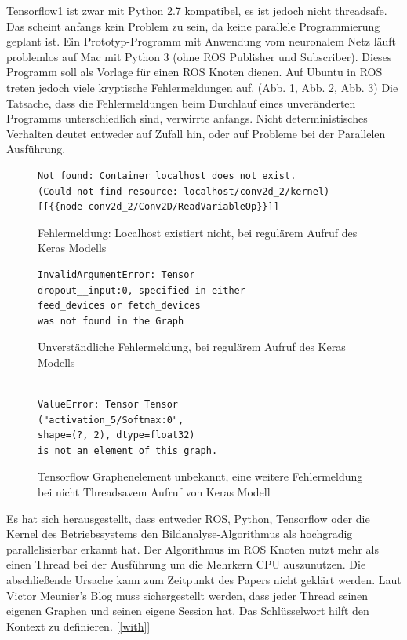 \documentclass[conference]{IEEEtran}
\begin{document}
Tensorflow1 ist zwar mit Python 2.7 kompatibel, es ist jedoch nicht 
threadsafe. Das scheint anfangs kein Problem zu sein, da keine parallele 
	Programmierung geplant ist. Ein Prototyp-Programm mit Anwendung vom 
	neuronalem Netz läuft problemlos auf Mac mit Python 3 (ohne ROS 
	Publisher und Subscriber). Dieses Programm 
	soll als Vorlage für einen ROS Knoten dienen. Auf Ubuntu in ROS treten 
	jedoch viele kryptische Fehlermeldungen auf. (Abb. \ref{Error1}, Abb. \ref{Error2}, Abb. \ref{Error3}) 
	Die Tatsache, dass die Fehlermeldungen beim Durchlauf eines 
	unveränderten Programms unterschiedlich sind, verwirrte anfangs. 
	Nicht deterministisches Verhalten deutet entweder auf Zufall hin, 
	oder auf Probleme bei der Parallelen Ausführung. 
	
	\begin{figure}
		\centering
		\begin{verbatim}
Not found: Container localhost does not exist. 
(Could not find resource: localhost/conv2d_2/kernel)
[[{{node conv2d_2/Conv2D/ReadVariableOp}}]]
\end{verbatim}
		\label{Error1}
		\caption{Fehlermeldung: Localhost existiert nicht, bei regulärem 
		Aufruf 
		des Keras Modells}
	\end{figure}
	
	\begin{figure}
		\centering
		\begin{verbatim}
InvalidArgumentError: Tensor 
dropout__input:0, specified in either 
feed_devices or fetch_devices
was not found in the Graph
		\end{verbatim}
		\label{Error2}
		\caption{Unverständliche Fehlermeldung, bei regulärem Aufruf 
			des Keras Modells}
	\end{figure}
		
	\begin{figure}
		\centering
		\begin{verbatim}

ValueError: Tensor Tensor
("activation_5/Softmax:0",
shape=(?, 2), dtype=float32) 
is not an element of this graph.
\end{verbatim}
		\label{Error3}
		\caption{Tensorflow Graphenelement unbekannt, eine weitere 
		Fehlermeldung bei nicht Threadsavem Aufruf von Keras Modell}
	\end{figure}
	
	Es hat sich herausgestellt, dass entweder ROS, Python, Tensorflow oder die Kernel 
	des Betriebssystems den Bildanalyse-Algorithmus als hochgradig 
	parallelisierbar erkannt hat. Der Algorithmus im ROS Knoten nutzt mehr 
	als einen Thread bei der Ausführung um die Mehrkern CPU auszunutzen. 
	Die abschließende Ursache kann zum Zeitpunkt des Papers nicht geklärt 
	werden.
	Laut Victor Meunier's Blog \cite{Keras} 
	muss sichergestellt werden, dass jeder Thread seinen eigenen Graphen und seinen eigene Session hat. Das Schlüsselwort  hilft den Kontext zu definieren. [\ref{with}]\\
	
\end{document}
